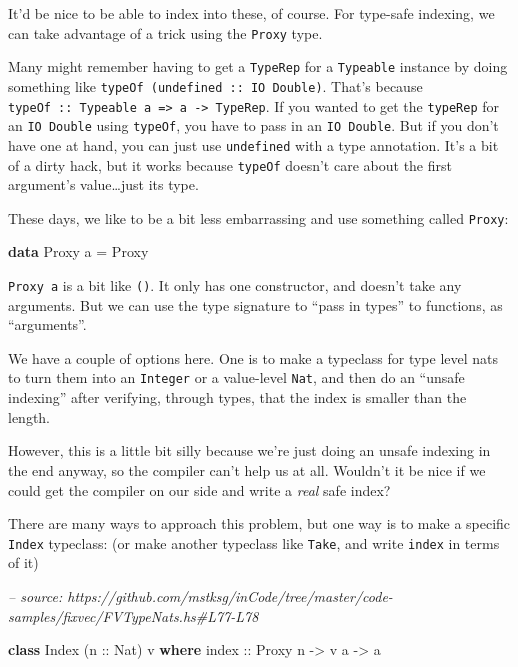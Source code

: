 \documentclass[]{article}
\newenvironment{Shaded}{}{}
\newcommand{\CommentTok}[1]{\textcolor[rgb]{0.38,0.63,0.69}{\textit{#1}}}
\newcommand{\DataTypeTok}[1]{\textcolor[rgb]{0.56,0.13,0.00}{#1}}
\newcommand{\FunctionTok}[1]{\textcolor[rgb]{0.02,0.16,0.49}{#1}}
\newcommand{\KeywordTok}[1]{\textcolor[rgb]{0.00,0.44,0.13}{\textbf{#1}}}
\newcommand{\NormalTok}[1]{#1}
\newcommand{\OtherTok}[1]{\textcolor[rgb]{0.00,0.44,0.13}{#1}}
\begin{document}
It'd be nice to be able to index into these, of course. For type-safe indexing,
we can take advantage of a trick using the \texttt{Proxy} type.

Many might remember having to get a \texttt{TypeRep} for a \texttt{Typeable}
instance by doing something like \texttt{typeOf\ (undefined\ ::\ IO\ Double)}.
That's because
\texttt{typeOf\ ::\ Typeable\ a\ =\textgreater{}\ a\ -\textgreater{}\ TypeRep}.
If you wanted to get the \texttt{typeRep} for an \texttt{IO\ Double} using
\texttt{typeOf}, you have to pass in an \texttt{IO\ Double}. But if you don't
have one at hand, you can just use \texttt{undefined} with a type annotation.
It's a bit of a dirty hack, but it works because \texttt{typeOf} doesn't care
about the first argument's value\ldots{}just its type.

These days, we like to be a bit less embarrassing and use something called
\texttt{Proxy}:

\begin{Shaded}
\begin{Highlighting}[]
\KeywordTok{data} \DataTypeTok{Proxy}\NormalTok{ a }\FunctionTok{=} \DataTypeTok{Proxy}
\end{Highlighting}
\end{Shaded}

\texttt{Proxy\ a} is a bit like \texttt{()}. It only has one constructor, and
doesn't take any arguments. But we can use the type signature to ``pass in
types'' to functions, as ``arguments''.

We have a couple of options here. One is to make a typeclass for type level nats
to turn them into an \texttt{Integer} or a value-level \texttt{Nat}, and then do
an ``unsafe indexing'' after verifying, through types, that the index is smaller
than the length.

However, this is a little bit silly because we're just doing an unsafe indexing
in the end anyway, so the compiler can't help us at all. Wouldn't it be nice if
we could get the compiler on our side and write a \emph{real} safe index?

There are many ways to approach this problem, but one way is to make a specific
\texttt{Index} typeclass: (or make another typeclass like \texttt{Take}, and
write \texttt{index} in terms of it)

\begin{Shaded}
\begin{Highlighting}[]
\CommentTok{-- source: https://github.com/mstksg/inCode/tree/master/code-samples/fixvec/FVTypeNats.hs#L77-L78}

\KeywordTok{class} \DataTypeTok{Index}\NormalTok{ (}\OtherTok{n ::} \DataTypeTok{Nat}\NormalTok{) v }\KeywordTok{where}
\OtherTok{    index ::} \DataTypeTok{Proxy}\NormalTok{ n }\OtherTok{->}\NormalTok{ v a }\OtherTok{->}\NormalTok{ a}
\end{Highlighting}
\end{Shaded}
\end{document}
